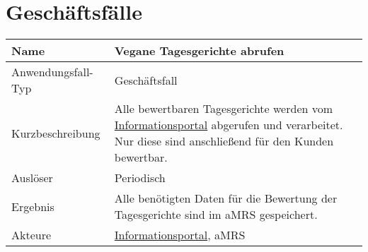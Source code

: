 \section{Geschäftsfälle}\label{sec:Geschaeftsfaelle}


\begin{table}[H]
    \centering
    \label{veganetagesgerichteabrufen}
    \begin{tabularx}{\textwidth}{| l | X |}
        \hline
        Name               & Vegane Tagesgerichte abrufen                                                                                                                                                     \\
        \hline
        Anwendungsfall-Typ & Geschäftsfall                                                                                                                                                                    \\
        \hline
        Kurzbeschreibung   & Alle bewertbaren Tagesgerichte werden vom \hyperref[gls:informationsportal]{Informationsportal} abgerufen und verarbeitet. Nur diese sind anschließend für den Kunden bewertbar. \\
        \hline
        Auslöser           & Periodisch                                                                                                                                                                       \\
        \hline
        Ergebnis           & Alle benötigten Daten für die Bewertung der Tagesgerichte sind im aMRS gespeichert.                                                                                              \\
        \hline
        Akteure            & \hyperref[gls:informationsportal]{Informationsportal}, \ac{aMRS}                                                                                                                 \\
        \hline
    \end{tabularx}
\end{table}


